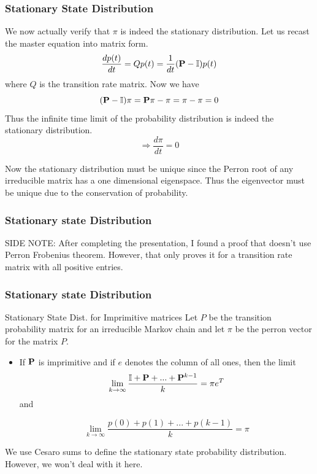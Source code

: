 \documentclass[9pt]{beamer}
\newcommand{\PP}{\bold{P}}
\begin{document}
\begin{frame}
  \frametitle{Stationary State Distribution}
  We now actually verify that $\pi$ is indeed the stationary distribution. 
  Let us recast the master equation into matrix form.
  $$ \frac{d p(t)}{dt} = Q p(t) = \frac{1}{dt}(\PP - \mathbb{I}) p(t)$$ where
  $Q$ is the transition rate matrix. Now we have 
  $$ (\PP - \mathbb{I})\pi = \PP \pi - \pi = \pi -\pi = 0 $$
  Thus the infinite time limit of the probability distribution is indeed the stationary distribution.
  $$  \Rightarrow  \frac{d \pi }{dt} = 0$$

  Now the stationary distribution must be unique since the Perron root of any irreducible 
  matrix has a one dimensional eigenspace. Thus the eigenvector must be unique due to 
  the conservation of probability.
  \hfill \square
\end{frame}

\begin{frame}
  \frametitle{Stationary state Distribution}
  SIDE NOTE: After completing the presentation, I found a proof that doesn't use Perron Frobenius theorem. However, that only proves it 
  for a transition rate matrix with all positive entries.\cite{PelitiPigolotti2023}
\end{frame}
\begin{frame}
  \frametitle{Stationary state Distribution}
  \begin{block}{Stationary State Dist. for Imprimitive matrices}
  Let $P$ be the transition probability matrix for an irreducible Markov chain and 
  let $\pi$ be the perron vector for the matrix $P$. 
  \begin{itemize}
      \item If $\PP$ is imprimitive and if $e$ denotes the column of all ones, then the limit
        $$\lim_{k \to \infty} \frac{\mathbb{I} + \PP + ... +\PP^{k-1}}{k} = \pi e^T $$ and 
        
        $$ \lim_{k \to \infty} \frac{p(0) + p(1) + ...+p(k-1)}{k} = \pi$$ 
  \end{itemize}
  \end{block}

  We use Cesaro sums to define the stationary state probability distribution. However, we won't deal with it here. 

\end{frame}
\end{document}
